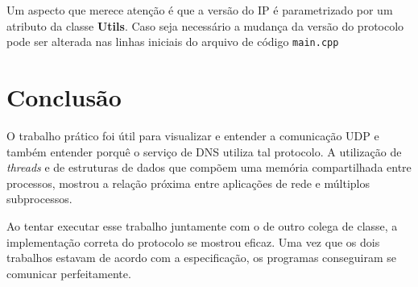 \documentclass[10pt]{extarticle}
\begin{document}
Um aspecto que merece atenção é que a versão do IP é parametrizado por um
atributo da classe \textbf{Utils}.
Caso seja necessário a mudança da versão do protocolo pode ser alterada nas
linhas iniciais do arquivo de código \texttt{main.cpp}

\section{Conclusão}
O trabalho prático foi útil para visualizar e entender a comunicação UDP e
também entender porquê o serviço de DNS utiliza tal protocolo.
A utilização de \textit{threads} e de estruturas de dados que compõem uma
memória compartilhada entre processos, mostrou a relação próxima entre
aplicações de rede e múltiplos subprocessos.

Ao tentar executar esse trabalho juntamente com o de outro colega de classe,
a implementação correta do protocolo se mostrou eficaz.
Uma vez que os dois trabalhos estavam de acordo com a especificação, os
programas conseguiram se comunicar perfeitamente. 
\end{document}
